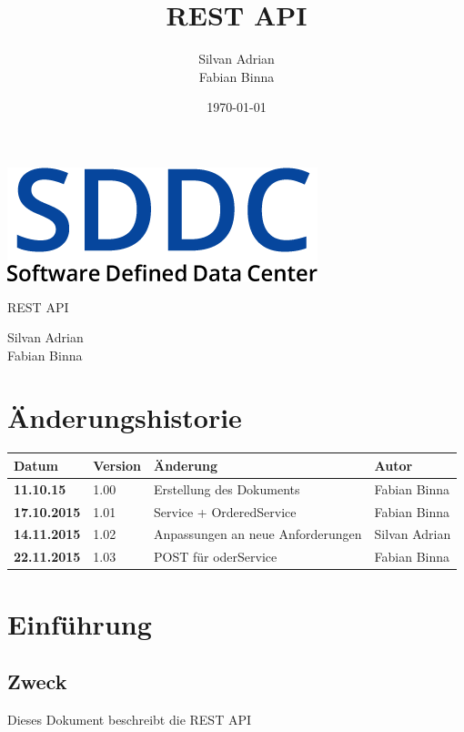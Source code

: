 \documentclass[11pt]{scrartcl}
\title{REST API}
\author{Silvan Adrian \\ Fabian Binna}
\date{\today{}}
\begin{document}
\def\arraystretch{1.5}
\begin{titlepage}
\begin{center}
\vspace{10em}
\includegraphics[scale=2]{SDDC}
\vspace{10em}
\end{center}
\begin{center}
\huge {REST API}
\end{center}
\begin{center}
\vspace{10em}
\LARGE {Silvan Adrian} \\
\LARGE {Fabian Binna}
\end{center}

\end{titlepage}

\newpage
\section{Änderungshistorie}
\begin{tabularx}{\linewidth}{l l X l}
\textbf{Datum} & \textbf{Version} & \textbf{Änderung}  & \textbf{Autor} \\
\hline
\textbf{11.10.15} & 1.00 & Erstellung des Dokuments & Fabian Binna \\
\textbf{17.10.2015} & 1.01 & Service + OrderedService & Fabian Binna\\
\textbf{14.11.2015} & 1.02 & Anpassungen an neue Anforderungen & Silvan Adrian\\
\textbf{22.11.2015} & 1.03 & POST für oderService & Fabian Binna\\
\end{tabularx}

\newpage
\tableofcontents
\newpage

\section{Einführung}
\subsection{Zweck}
Dieses Dokument beschreibt die REST API
\end{document}
